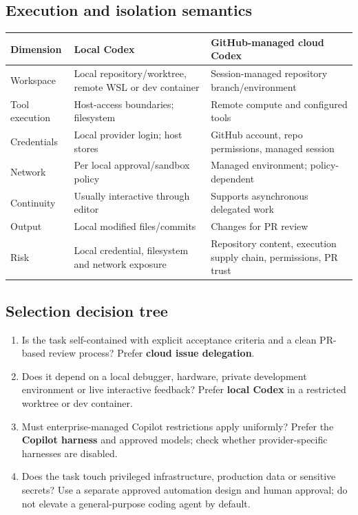 \documentclass[11pt,letterpaper,oneside]{article}
\begin{document}
\subsection{Execution and isolation semantics}
\begin{table}[htbp]
\small
\centering
\begin{tabularx}{\linewidth}{@{}>{\raggedright\arraybackslash}p{2.65cm}Y Y@{}}
\toprule
\textbf{Dimension} & \textbf{Local Codex} & \textbf{GitHub-managed cloud Codex}\tabularnewline\midrule
Workspace & Local repository/worktree, remote WSL or dev container & Session-managed repository branch/environment\\
Tool execution & Host-access boundaries; filesystem & Remote compute and configured tools\\
Credentials & Local provider login; host stores & GitHub account, repo permissions, managed session\\
Network & Per local approval/sandbox policy & Managed environment; policy-dependent\\
Continuity & Usually interactive through editor & Supports asynchronous delegated work\\
Output & Local modified files/commits & Changes for PR review\\
Risk & Local credential, filesystem and network exposure & Repository content, execution supply chain, permissions, PR trust\\
\bottomrule
\end{tabularx}
\end{table}

\subsection{Selection decision tree}
\begin{enumerate}
\item Is the task self-contained with explicit acceptance criteria and a clean PR-based review process? Prefer \textbf{cloud issue delegation}.
\item Does it depend on a local debugger, hardware, private development environment or live interactive feedback? Prefer \textbf{local Codex} in a restricted worktree or dev container.
\item Must enterprise-managed Copilot restrictions apply uniformly? Prefer the \textbf{Copilot harness} and approved models; check whether provider-specific harnesses are disabled.
\item Does the task touch privileged infrastructure, production data or sensitive secrets? Use a separate approved automation design and human approval; do not elevate a general-purpose coding agent by default.
\end{enumerate}
\end{document}
